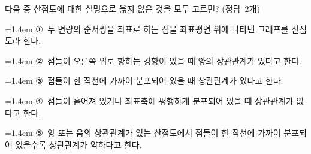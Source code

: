 다음 중 산점도에 대한 설명으로 옳지 \underline{않은} 것을 모두 고르면? \mbox{(정답 2개)}
\par\medskip\par\noindent\hangindent=1.4em {\small ①}\ 두 변량의 순서쌍을 좌표로 하는 점을 좌표평면 위에 나타낸 그래프를 산점도라 한다.\par\noindent\hangindent=1.4em {\small ②}\ 점들이 오른쪽 위로 향하는 경향이 있을 때 양의 상관관계가 있다고 한다.\par\noindent\hangindent=1.4em {\small ③}\ 점들이 한 직선에 가까이 분포되어 있을 때 상관관계가 있다고 한다.\par\noindent\hangindent=1.4em {\small ④}\ 점들이 흩어져 있거나 좌표축에 평행하게 분포되어 있을 때 상관관계가 없다고 한다.\par\noindent\hangindent=1.4em {\small ⑤}\ 양 또는 음의 상관관계가 있는 산점도에서 점들이 한 직선에 가까이 분포되어 있을수록 상관관계가 약하다고 한다.\par\medskip
